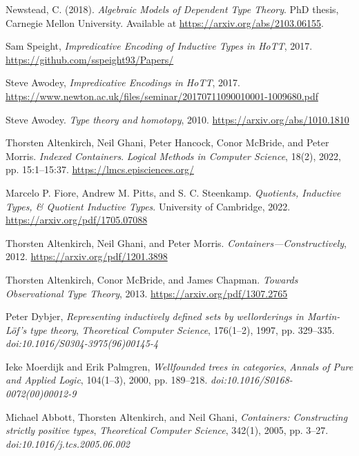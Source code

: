 \documentclass{article}
\begin{document}
\begin{thebibliography}{99}
Newstead, C. (2018).
\textit{Algebraic Models of Dependent Type Theory}.
PhD thesis, Carnegie Mellon University.
Available at \url{https://arxiv.org/abs/2103.06155}.


Sam Speight,
\textit{Impredicative Encoding of Inductive Types in HoTT},
2017.
\url{https://github.com/sspeight93/Papers/}

Steve Awodey,
\textit{Impredicative Encodings in HoTT},
2017.
\url{https://www.newton.ac.uk/files/seminar/20170711090010001-1009680.pdf}

Steve Awodey.
\textit{Type theory and homotopy},
2010.
\url{https://arxiv.org/abs/1010.1810}

Thorsten Altenkirch, Neil Ghani, Peter Hancock, Conor McBride, and Peter Morris.
\textit{Indexed Containers}.
\textit{Logical Methods in Computer Science}, 18(2), 2022, pp. 15:1--15:37.
\url{https://lmcs.episciences.org/}

Marcelo P. Fiore, Andrew M. Pitts, and S. C. Steenkamp.
\textit{Quotients, Inductive Types, \& Quotient Inductive Types}.
University of Cambridge, 2022.
\url{https://arxiv.org/pdf/1705.07088}

Thorsten Altenkirch, Neil Ghani, and Peter Morris.
\textit{Containers—Constructively},
2012.
\url{https://arxiv.org/pdf/1201.3898}

Thorsten Altenkirch, Conor McBride, and James Chapman.
\textit{Towards Observational Type Theory},
2013.
\url{https://arxiv.org/pdf/1307.2765}

Peter Dybjer,
\textit{Representing inductively defined sets by wellorderings in Martin-Löf’s type theory},
\textit{Theoretical Computer Science}, 176(1–2), 1997, pp. 329–335.
\textit{doi:10.1016/S0304-3975(96)00145-4}

Ieke Moerdijk and Erik Palmgren,
\textit{Wellfounded trees in categories},
\textit{Annals of Pure and Applied Logic}, 104(1–3), 2000, pp. 189–218.
\textit{doi:10.1016/S0168-0072(00)00012-9}

Michael Abbott, Thorsten Altenkirch, and Neil Ghani,
\textit{Containers: Constructing strictly positive types},
\textit{Theoretical Computer Science}, 342(1), 2005, pp. 3–27.
\textit{doi:10.1016/j.tcs.2005.06.002}


\end{thebibliography}
\end{document}

